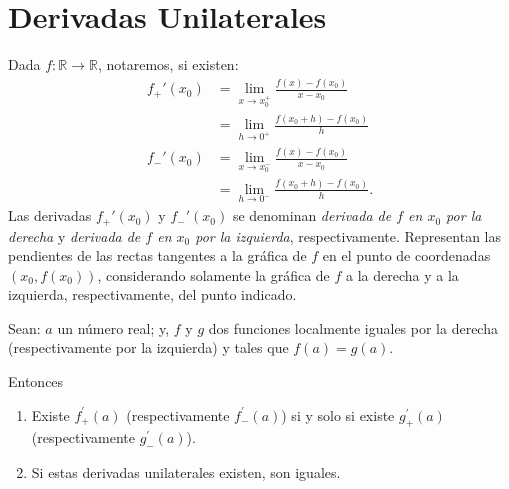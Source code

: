 \section{Derivadas Unilaterales}

\begin{defical}
Dada  $f:\mathbb{R}\to \mathbb{R}$, notaremos, si existen:
\begin{align*}
f_+'(x_0) &= \lim_{x\to x_0^+}\frac{f(x)-f(x_0)}{x-x_0} \\
          &= \lim_{h\to 0^+}\frac{f(x_0+h)-f(x_0)}{h}\\
f_-'(x_0) &= \lim_{x\to x_0^-}\frac{f(x)-f(x_0)}{x-x_0} \\
          &= \lim_{h\to 0^-}\frac{f(x_0+h)-f(x_0)}{h}.
\end{align*}
Las derivadas $f_+'(x_0) $ y $f_-'(x_0) $ se denominan \emph{derivada de $f$ en $x_0$ por la
derecha} y \emph{derivada de $f$ en $x_0$ por la izquierda}, respectivamente. Representan las
pendientes de las rectas tangentes a la gráfica de $f$ en el punto de coordenadas $(x_0,
f(x_0))$, considerando solamente la gráfica de $f$ a la derecha y a la izquierda,
respectivamente, del punto indicado.
\end{defical}

\begin{teocal}
Sean: $a$ un número real; y, $f$ y $g$ dos funciones localmente iguales por la derecha (respectivamente por la izquierda) y tales que $f(a)=g(a)$.

Entonces
\begin{enumerate}
\item Existe $f^{'}_{+}(a)$ (respectivamente $f^{'}_{-}(a)$) si y solo si existe $g^{'}_{+}(a)$ (respectivamente $g^{'}_{-}(a)$).
\item Si estas derivadas unilaterales existen, son iguales.
\end{enumerate}
\end{teocal}



